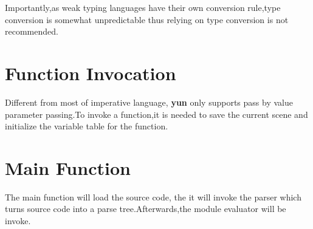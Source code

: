Importantly,as weak typing languages have their own conversion rule,type conversion is somewhat unpredictable thus relying on type conversion is not recommended.


\section{Function Invocation}
Different from most of imperative language, \textbf{yun} only supports pass by value parameter passing.To invoke a function,it is  needed to save the current scene and initialize the variable table for the function.



\section{Main Function}
The main function will load the source code, the it will invoke the parser which turns source code into a parse tree.Afterwards,the module evaluator will be invoke.



